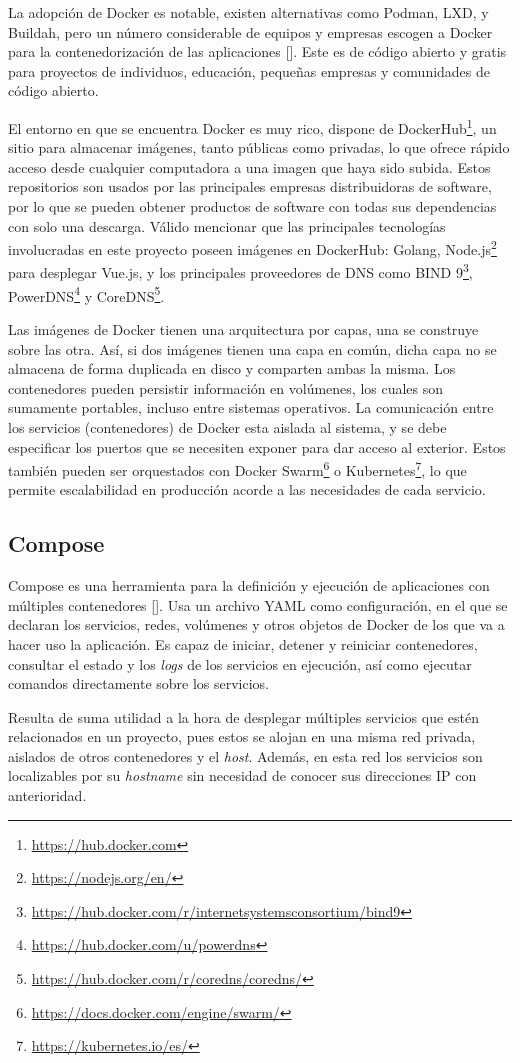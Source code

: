 La adopción de Docker es notable, existen alternativas como Podman, LXD, y Buildah, pero un número considerable de equipos y empresas escogen a Docker para la contenedorización de las aplicaciones [\cite{docker-usage}]. Este es de código abierto y gratis para proyectos de individuos, educación, pequeñas empresas y comunidades de código abierto.

El entorno en que se encuentra Docker es muy rico, dispone de DockerHub\footnote{\url{https://hub.docker.com}}, un sitio para almacenar imágenes, tanto públicas como privadas, lo que ofrece rápido acceso desde cualquier computadora a una imagen que haya sido subida. Estos repositorios son usados por las principales empresas distribuidoras de software, por lo que se pueden obtener productos de software con todas sus dependencias con solo una descarga. Válido mencionar que las principales tecnologías involucradas en este proyecto poseen imágenes en DockerHub: Golang, Node.js\footnote{\url{https://nodejs.org/en/}} para desplegar Vue.js, y los principales proveedores de DNS como BIND 9\footnote{\url{https://hub.docker.com/r/internetsystemsconsortium/bind9}}, PowerDNS\footnote{\url{https://hub.docker.com/u/powerdns}} y CoreDNS\footnote{\url{https://hub.docker.com/r/coredns/coredns/}}.

Las imágenes de Docker tienen una arquitectura por capas, una se construye sobre las otra. Así, si dos imágenes tienen una capa en común, dicha capa no se almacena de forma duplicada en disco y comparten ambas la misma. Los contenedores pueden persistir información en volúmenes, los cuales son sumamente portables, incluso entre sistemas operativos. La comunicación entre los servicios (contenedores) de Docker esta aislada al sistema, y se debe especificar los puertos que se necesiten exponer para dar acceso al exterior. Estos también pueden ser orquestados con Docker Swarm\footnote{\url{https://docs.docker.com/engine/swarm/}} o Kubernetes\footnote{\url{https://kubernetes.io/es/}}, lo que permite escalabilidad en producción acorde a las necesidades de cada servicio.

\subsection{Compose}

Compose es una herramienta para la definición y ejecución de aplicaciones con múltiples contenedores [\cite{docker-compose}]. Usa un archivo YAML como configuración, en el que se declaran los servicios, redes, volúmenes y otros objetos de Docker de los que va a hacer uso la aplicación. Es capaz de iniciar, detener y reiniciar contenedores, consultar el estado y los \textit{logs} de los servicios en ejecución, así como ejecutar comandos directamente sobre los servicios.      

Resulta de suma utilidad a la hora de desplegar múltiples servicios que estén relacionados en un proyecto, pues estos se alojan en una misma red privada, aislados de otros contenedores y el \textit{host}. Además, en esta red los servicios son localizables por su \textit{hostname} sin necesidad de conocer sus direcciones IP con anterioridad.

